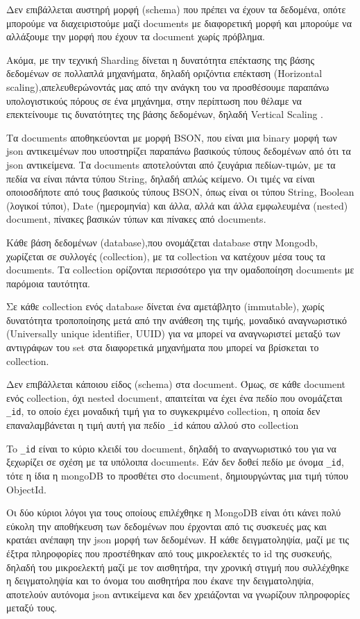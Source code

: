 Δεν επιβάλλεται αυστηρή μορφή (schema) που πρέπει να έχουν τα δεδομένα, οπότε μπορούμε να διαχειριστούμε μαζί documents με διαφορετική μορφή
και μπορούμε να αλλάξουμε την μορφή που έχουν τα document χωρίς πρόβλημα.

Ακόμα, με την τεχνική Sharding δίνεται η δυνατότητα επέκτασης της βάσης δεδομένων σε πολλαπλά μηχανήματα,
δηλαδή οριζόντια επέκταση (Horizontal scaling),απελευθερώνοντάς μας από την ανάγκη του να προσθέσουμε παραπάνω υπολογιστικούς πόρους σε ένα μηχάνημα, στην περίπτωση που θέλαμε να επεκτείνουμε τις δυνατότητες της βάσης δεδομένων,
δηλαδή Vertical Scaling \cite{mongoDBoverview}.

Τα documents αποθηκεύονται με μορφή BSON, που είναι μια binary μορφή των json αντικειμένων που υποστηρίζει παραπάνω βασικούς τύπους δεδομένων από ότι τα json αντικείμενα.
Τα documents αποτελούνται από ζευγάρια πεδίων-τιμών, με τα πεδία να είναι πάντα τύπου String, δηλαδή απλώς κείμενο.
Οι τιμές να είναι οποιοσδήποτε από τους βασικούς τύπους BSON, όπως είναι οι τύπου String, Boolean (λογικοί τύποι),  Date (ημερομηνία) και άλλα,
αλλά και άλλα εμφωλευμένα (nested) document, πίνακες βασικών τύπων και πίνακες από documents.

Κάθε βάση δεδομένων (database),που ονομάζεται database στην Mongodb, χωρίζεται σε συλλογές (collection),
με τα collection να κατέχουν μέσα τους τα documents.
Τα collection ορίζονται περισσότερο για την ομαδοποίηση documents με παρόμοια ταυτότητα.

Σε κάθε collection ενός database δίνεται ένα αμετάβλητο (immutable), χωρίς δυνατότητα τροποποίησης μετά από την ανάθεση της τιμής,
μοναδικό αναγνωριστικό (Universally unique identifier, UUID) για να μπορεί να αναγνωριστεί μεταξύ των αντιγράφων του set στα διαφορετικά μηχανήματα
που μπορεί να βρίσκεται το collection.

Δεν επιβάλλεται κάποιου είδος (schema) στα document.
Όμως, σε κάθε document ενός collection, όχι nested document, απαιτείται να έχει ένα πεδίο που ονομάζεται \texttt{\_id},
το οποίο έχει μοναδική τιμή για το συγκεκριμένο collection, η οποία δεν επαναλαμβάνεται η τιμή αυτή για πεδίο \texttt{\_id} κάπου αλλού στο collection

To \texttt{\_id} είναι το κύριο κλειδί του document, δηλαδή το αναγνωριστικό του για να ξεχωρίζει σε σχέση με τα υπόλοιπα documents.
Εάν δεν δοθεί πεδίο με όνομα \texttt{\_id}, τότε η ίδια η mongoDB το προσθέτει στο document, δημιουργώντας μια τιμή τύπου ObjectId.

Οι δύο κύριοι λόγοι για τους οποίους επιλέχθηκε η MongoDB είναι ότι κάνει πολύ εύκολη την αποθήκευση των δεδομένων που έρχονται από τις συσκευές μας και κρατάει ανέπαφη την json μορφή των δεδομένων.
Η κάθε δειγματοληψία, μαζί με τις έξτρα πληροφορίες που προστέθηκαν από τους μικροελεκτές το id της συσκευής, δηλαδή του μικροελεκτή μαζί με τον αισθητήρα, την χρονική στιγμή που συλλέχθηκε η δειγματοληψία και το όνομα του αισθητήρα που έκανε την δειγματοληψία,
αποτελούν αυτόνομα json αντικείμενα και δεν χρειάζονται να γνωρίζουν πληροφορίες μεταξύ τους.


